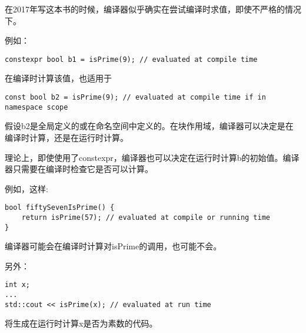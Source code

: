 \begin{tcolorbox}[colback=webgreen!5!white,colframe=webgreen!75!black]
\hspace*{0.75cm}在2017年写这本书的时候，编译器似乎确实在尝试编译时求值，即使不严格的情况下。
\end{tcolorbox}

例如：

\begin{lstlisting}[style=styleCXX]
constexpr bool b1 = isPrime(9); // evaluated at compile time
\end{lstlisting}

在编译时计算该值，也适用于

\begin{lstlisting}[style=styleCXX]
const bool b2 = isPrime(9); // evaluated at compile time if in namespace scope
\end{lstlisting}

假设b2是全局定义的或在命名空间中定义的。在块作用域，编译器可以决定是在编译时计算，还是在运行时计算。

\begin{tcolorbox}[colback=webgreen!5!white,colframe=webgreen!75!black]
\hspace*{0.75cm}理论上，即使使用了constexpr，编译器也可以决定在运行时计算b的初始值。编译器只需要在编译时检查它是否可以计算。
\end{tcolorbox}

例如，这样:

\begin{lstlisting}[style=styleCXX]
bool fiftySevenIsPrime() {
	return isPrime(57); // evaluated at compile or running time
}
\end{lstlisting}

编译器可能会在编译时计算对isPrime的调用，也可能不会。

另外：

\begin{lstlisting}[style=styleCXX]
int x;
...
std::cout << isPrime(x); // evaluated at run time
\end{lstlisting}

将生成在运行时计算x是否为素数的代码。

